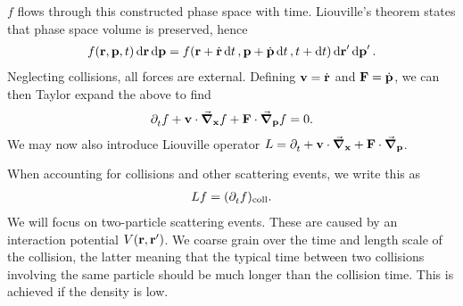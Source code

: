 $f$ flows through this constructed phase space with time. Liouville's theorem states that phase space volume is preserved, hence
\begin{align*}
	f(\vb{r}, \vb{p}, t)\dd{\vb{r}}\dd{\vb{p}} = f(\vb{r} + \dot{\vb{r}}\dd{t}, \vb{p} + \dot{\vb{p}}\dd{t}, t + \dd{t})\dd{\vb{r}}^{\prime}\dd{\vb{p}}^{\prime}.
\end{align*}
Neglecting collisions, all forces are external. Defining $\vb{v} = \dot{\vb{r}}$ and $\vb{F} = \dot{\vb{p}}$, we can then Taylor expand the above to find
\begin{align*}
	\partial^{}_{t}{f} + \vb{v}\cdot\grad_{\vb{x}}{f} + \vb{F}\cdot\grad_{\vb{p}}{f} = 0.
\end{align*}
We may now also introduce Liouville operator $L = \partial^{}_{t}{} + \vb{v}\cdot\grad_{\vb{x}}{} + \vb{F}\cdot\grad_{\vb{p}}{}$.

When accounting for collisions and other scattering events, we write this as
\begin{align*}
	Lf = (\partial^{}_{t}{f})_{\text{coll}}.
\end{align*}
We will focus on two-particle scattering events. These are caused by an interaction potential $V(\vb{r}, \vb{r}^{\prime})$. We coarse grain over the time and length scale of the collision, the latter meaning that the typical time between two collisions involving the same particle should be much longer than the collision time. This is achieved if the density is low.

